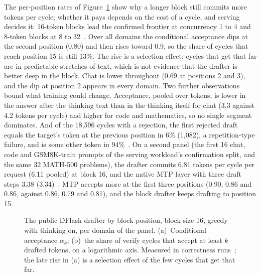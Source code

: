 The per-position rates of Figure~\ref{fig:drafter-acceptance} show why a longer block still commits more tokens per cycle; whether it pays depends on the cost of a cycle, and serving decides it: 16-token blocks lead the confirmed frontier at concurrency 1 to 4 and 8-token blocks at 8 to 32~. Over all domains the conditional acceptance dips at the second position (0.80) and then rises toward 0.9, so the share of cycles that reach position 15 is still 13\%. The rise is a selection effect: cycles that get that far are in predictable stretches of text, which is not evidence that the drafter is better deep in the block. Chat is lower throughout (0.69 at positions 2 and 3), and the dip at position 2 appears in every domain. Two further observations bound what training could change. Acceptance, pooled over tokens, is lower in the answer after the thinking text than in the thinking itself for chat (3.3 against 4.2 tokens per cycle) and higher for code and mathematics, so no single segment dominates. And of the 18,596 cycles with a rejection, the first rejected draft equals the target's token at the previous position in 6\% (1,082), a repetition-type failure, and is some other token in 94\%~. On a second panel (the first 16 chat, code and GSM8K-train prompts of the serving workload's confirmation split, and the same 32 MATH-500 problems), the drafter commits 6.81 tokens per cycle per request (6.11 pooled) at block 16, and the native MTP layer with three draft steps 3.38 (3.34)~. MTP accepts more at the first three positions (0.90, 0.86 and 0.86, against 0.86, 0.79 and 0.81), and the block drafter keeps drafting to position 15.

\begin{figure}[htbp]
\centering
%
\caption{The public DFlash drafter by block position, block size 16, greedy with thinking on, per domain of the panel. (a)~Conditional acceptance $\alpha_k$; (b)~the share of verify cycles that accept at least $k$ drafted tokens, on a logarithmic axis. Measured in correctness runs~; the late rise in (a) is a selection effect of the few cycles that get that far.}
\label{fig:drafter-acceptance}
\end{figure}

